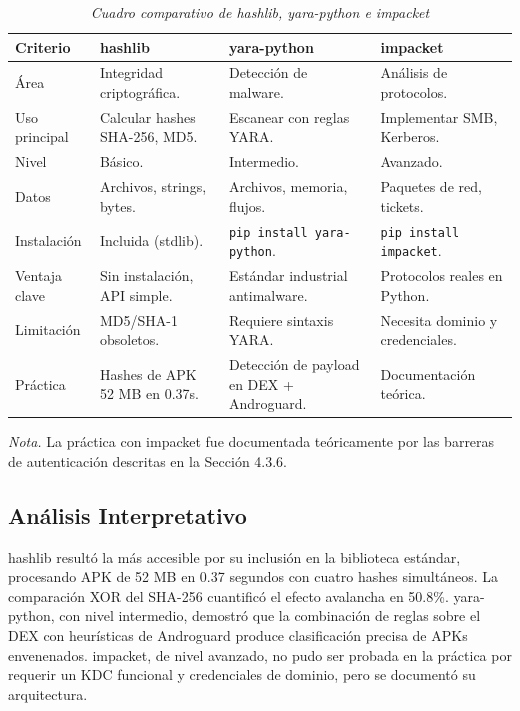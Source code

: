 \documentclass[12pt,a4paper]{article}
\begin{document}
\begin{table}[H]
\centering
\begin{threeparttable}
\caption{\textit{Cuadro comparativo de hashlib, yara-python e impacket}}
\begin{tabular}{p{2.5cm}p{3.5cm}p{3.5cm}p{3.5cm}}
\toprule
\textbf{Criterio} & \textbf{hashlib} & \textbf{yara-python} & \textbf{impacket} \\
\midrule
Área & Integridad criptográfica. & Detección de malware. & Análisis de protocolos. \\
Uso principal & Calcular hashes SHA-256, MD5. & Escanear con reglas YARA. & Implementar SMB, Kerberos. \\
Nivel & Básico. & Intermedio. & Avanzado. \\
Datos & Archivos, strings, bytes. & Archivos, memoria, flujos. & Paquetes de red, tickets. \\
Instalación & Incluida (stdlib). & \texttt{pip install yara-python}. & \texttt{pip install impacket}. \\
Ventaja clave & Sin instalación, API simple. & Estándar industrial antimalware. & Protocolos reales en Python. \\
Limitación & MD5/SHA-1 obsoletos. & Requiere sintaxis YARA. & Necesita dominio y credenciales. \\
Práctica & Hashes de APK 52 MB en 0.37s. & Detección de payload en DEX + Androguard. & Documentación teórica. \\
\bottomrule
\end{tabular}
\begin{tablenotes}
\item \textit{Nota.} La práctica con impacket fue documentada teóricamente por las barreras de autenticación descritas en la Sección 4.3.6.
\end{tablenotes}
\end{threeparttable}
\end{table}

\subsection{Análisis Interpretativo}

hashlib resultó la más accesible por su inclusión en la biblioteca
estándar, procesando APK de 52 MB en 0.37 segundos con cuatro hashes
simultáneos. La comparación XOR del SHA-256 cuantificó el efecto
avalancha en 50.8\%. yara-python, con nivel intermedio, demostró que
la combinación de reglas sobre el DEX con heurísticas de Androguard
produce clasificación precisa de APKs envenenados. impacket, de nivel
avanzado, no pudo ser probada en la práctica por requerir un KDC
funcional y credenciales de dominio, pero se documentó su arquitectura.
\end{document}
